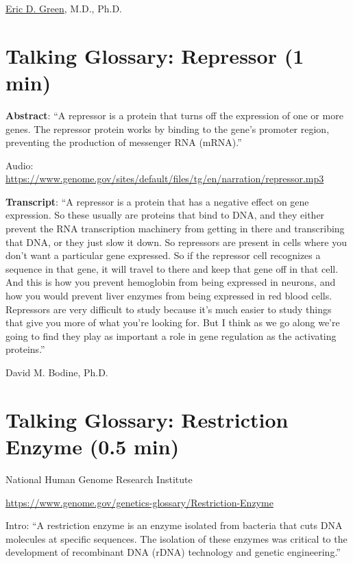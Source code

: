 \documentclass[
]{book}
\begin{document}
\href{https://www.genome.gov/staff/Eric-D-Green-MD-PhD}{Eric D. Green}, M.D., Ph.D.

\hypertarget{talking-glossary-repressor-1-min}{%
\section{Talking Glossary: Repressor (1 min)}\label{talking-glossary-repressor-1-min}}

\textbf{Abstract}: ``A repressor is a protein that turns off the expression of one or more genes. The repressor protein works by binding to the gene's promoter region, preventing the production of messenger RNA (mRNA).''

Audio: \url{https://www.genome.gov/sites/default/files/tg/en/narration/repressor.mp3}

\textbf{Transcript}: ``A repressor is a protein that has a negative effect on gene expression. So these usually are proteins that bind to DNA, and they either prevent the RNA transcription machinery from getting in there and transcribing that DNA, or they just slow it down. So repressors are present in cells where you don't want a particular gene expressed. So if the repressor cell recognizes a sequence in that gene, it will travel to there and keep that gene off in that cell. And this is how you prevent hemoglobin from being expressed in neurons, and how you would prevent liver enzymes from being expressed in red blood cells. Repressors are very difficult to study because it's much easier to study things that give you more of what you're looking for. But I think as we go along we're going to find they play as important a role in gene regulation as the activating proteins.''

David M. Bodine, Ph.D.

\hypertarget{talking-glossary-restriction-enzyme-0.5-min}{%
\section{Talking Glossary: Restriction Enzyme (0.5 min)}\label{talking-glossary-restriction-enzyme-0.5-min}}

National Human Genome Research Institute

\url{https://www.genome.gov/genetics-glossary/Restriction-Enzyme}

Intro: ``A restriction enzyme is an enzyme isolated from bacteria that cuts DNA molecules at specific sequences. The isolation of these enzymes was critical to the development of recombinant DNA (rDNA) technology and genetic engineering.''
\end{document}
